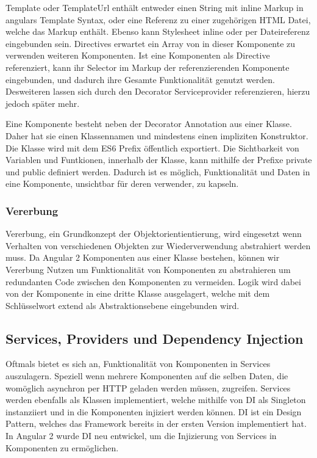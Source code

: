 Template oder TemplateUrl enthält entweder einen String mit inline Markup in angulars Template Syntax,
oder eine Referenz zu einer zugehörigen HTML Datei, welche das Markup enthält.
Ebenso kann Stylesheet inline oder per Dateireferenz eingebunden sein.
Directives erwartet ein Array von in dieser Komponente zu verwenden weiteren Komponenten.
Ist eine Komponenten als Directive referenziert,
kann ihr Selector im Markup der referenzierenden Komponente eingebunden,
und dadurch ihre Gesamte Funktionalität genutzt werden.
Desweiteren lassen sich durch den Decorator Serviceprovider referenzieren, hierzu jedoch später mehr.

Eine Komponente besteht neben der Decorator Annotation aus einer Klasse.
Daher hat sie einen Klassennamen und mindestens einen impliziten Konstruktor.
Die Klasse wird mit dem ES6 Prefix öffentlich exportiert. Die Sichtbarkeit von Variablen und Funtkionen,
innerhalb der Klasse, kann mithilfe der Prefixe private und public definiert werden.
Dadurch ist es möglich, Funktionalität und Daten in eine Komponente, unsichtbar für deren verwender, zu kapseln.

\vspace{1cm}

\vspace{1cm}


\subsubsection{Vererbung}

Vererbung, ein Grundkonzept der Objektorientientierung,
wird eingesetzt wenn Verhalten von verschiedenen Objekten zur Wiederverwendung
abstrahiert werden muss. Da Angular 2 Komponenten aus einer Klasse bestehen,
können wir Vererbung Nutzen um Funktionalität von Komponenten zu abstrahieren
um redundanten Code zwischen den Komponenten
zu vermeiden. Logik wird dabei von der Komponente in eine dritte Klasse ausgelagert,
welche mit dem Schlüsselwort extend als
Abstraktionsebene eingebunden wird. \cite{DanWa45:online}


\subsection{Services, Providers und Dependency Injection}

Oftmals bietet es sich an, Funktionalität von Komponenten in Services auszulagern.
Speziell wenn mehrere Komponenten auf die selben Daten,
die womöglich asynchron per HTTP geladen werden müssen, zugreifen.
Services werden ebenfalls als Klassen implementiert, welche mithilfe von \ac{DI}
als Singleton instanziiert und in die Komponenten injiziert werden können.
\ac{DI} ist ein Design Pattern, welches das Framework bereits in der ersten Version implementiert hat.
In Angular 2 wurde \ac{DI} neu entwickel, um die Injizierung von Services in Komponenten zu ermöglichen.


